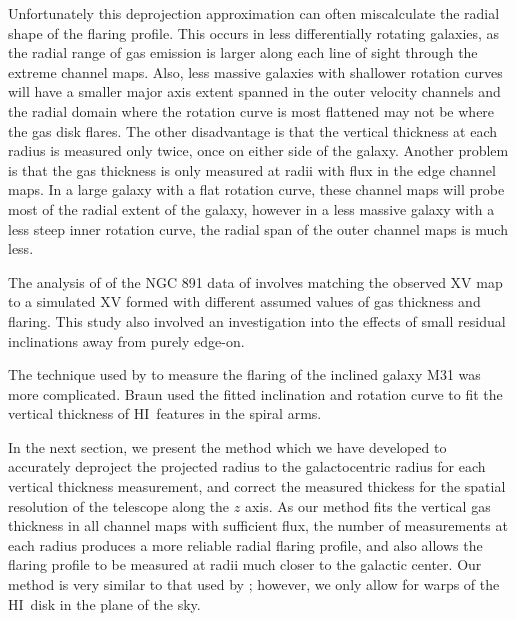 \documentclass[traditabstract]{aa} %
\newcommand\HI{H{\small I}}
\begin{document}
Unfortunately this deprojection approximation can often miscalculate
the radial shape of the flaring profile. This occurs in less
differentially rotating galaxies, as the radial range of gas emission
is larger along each line of sight through the extreme channel maps.
Also, less massive galaxies with shallower rotation curves will have a
smaller major axis extent spanned in the outer velocity channels and the
radial domain where the rotation curve is most flattened may not be
where the gas disk flares. The other disadvantage is that the vertical
thickness at each radius is measured only twice, once on either side
of the galaxy. Another problem is that the gas thickness is only
measured at radii with flux in the edge channel maps. In a large
galaxy with a flat rotation curve, these channel maps will probe most
of the radial extent of the galaxy, however in a less massive galaxy
with a less steep inner rotation curve, the radial span of the outer
channel maps is much less. 

The analysis of \citet{vdkruit1981} of the NGC 891 data of \citet{sa1979}
involves matching the observed XV map to a simulated XV formed with different
assumed values of gas thickness and flaring. This study also involved an investigation into
the effects of small residual inclinations away from purely edge-on.

The technique used by \citet{braun1991} to measure the flaring of the
inclined galaxy M31 was more complicated. Braun used the
fitted inclination and rotation curve to fit the vertical thickness of
\HI\ features in the spiral arms.

In the next section, we present the method which we have developed to
accurately deproject the projected radius to the 
galactocentric radius for each vertical thickness measurement, and
correct the measured thickess for the spatial resolution of the
telescope along the $z$ axis. As our method fits the vertical gas
thickness in all channel maps with sufficient flux, the number of
measurements at each radius produces a more reliable radial flaring
profile, and also allows the flaring profile to be measured at radii
much closer to the galactic center. Our method is very similar to that
used by \citet{olling1996a}; however, we only allow for warps of the
\HI\ disk in the plane of the sky.


\end{document}
